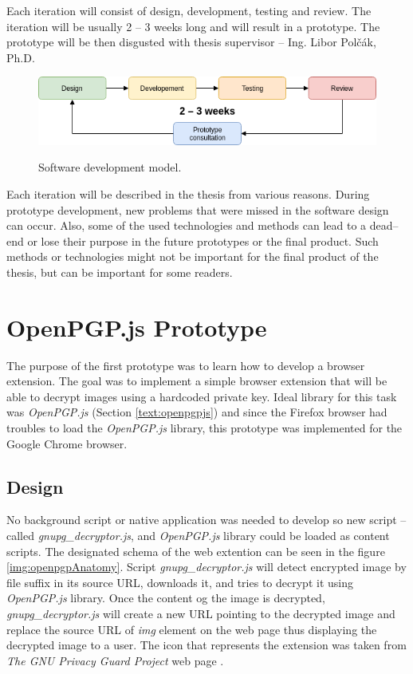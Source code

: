 Each iteration will consist of design, development, testing and review. The iteration will be usually 2 -- 3 weeks long and will result in a prototype. The prototype will be then disgusted with thesis supervisor -- Ing. Libor Polčák, Ph.D.

\begin{figure}[H]
    \begin{center}
        \label{img:extensionAnatomy}
        \includegraphics[width=1.0\textwidth]{obrazky-figures/developementModel.png}
        \caption{Software development model.}
    \end{center}
\end{figure}

Each iteration will be described in the thesis from various reasons. During prototype development, new problems that were missed in the software design can occur. Also, some of the used technologies and methods can lead to a dead--end or lose their purpose in the future prototypes or the final product. Such methods or technologies might not be important for the final product of the thesis, but can be important for some readers.

\section{OpenPGP.js Prototype}
\label{prototype:OpenPGPjs}
The purpose of the first prototype was to learn how to develop a browser extension. The goal was to implement a simple browser extension that will be able to decrypt images using a hardcoded private key. Ideal library for this task was \textit{OpenPGP.js} (Section \ref{text:openpgpjs}) and since the Firefox browser had troubles to load the \textit{OpenPGP.js} library, this prototype was implemented for the Google Chrome browser.

\subsection{Design}
No background script or native application was needed to develop so new script -- called \textit{gnupg\_decryptor.js}, and \textit{OpenPGP.js} library could be loaded as content scripts. The designated schema of the web extention can be seen in the figure \ref{img:openpgpAnatomy}. Script \textit{gnupg\_decryptor.js} will detect encrypted image by file suffix in its source URL, downloads it, and tries to decrypt it using \textit{OpenPGP.js} library. Once the content og the image is decrypted, \textit{gnupg\_decryptor.js} will create a new URL pointing to the decrypted image and replace the source URL of \textit{img} element on the web page thus displaying the decrypted image to a user. The icon that represents the extension was taken from \textit{The GNU Privacy Guard Project} web page \cite{GnuPG}.

